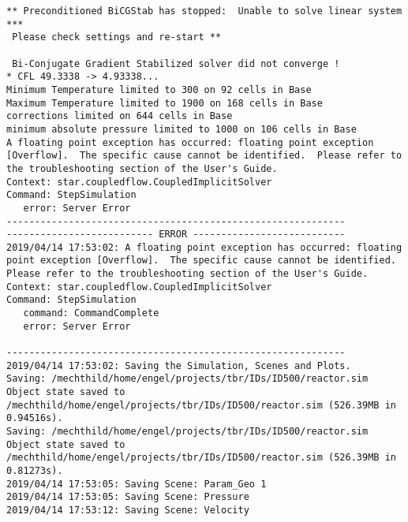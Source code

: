 \documentclass{article}
\begin{document}
{\begin{verbatim}
** Preconditioned BiCGStab has stopped:  Unable to solve linear system *** 
 Please check settings and re-start ** 

 Bi-Conjugate Gradient Stabilized solver did not converge !
* CFL 49.3338 -> 4.93338...
Minimum Temperature limited to 300 on 92 cells in Base
Maximum Temperature limited to 1900 on 168 cells in Base
corrections limited on 644 cells in Base
minimum absolute pressure limited to 1000 on 106 cells in Base
A floating point exception has occurred: floating point exception [Overflow].  The specific cause cannot be identified.  Please refer to the troubleshooting section of the User's Guide.
Context: star.coupledflow.CoupledImplicitSolver
Command: StepSimulation
   error: Server Error
------------------------------------------------------------
-------------------------- ERROR ---------------------------
2019/04/14 17:53:02: A floating point exception has occurred: floating point exception [Overflow].  The specific cause cannot be identified.  Please refer to the troubleshooting section of the User's Guide.
Context: star.coupledflow.CoupledImplicitSolver
Command: StepSimulation
   command: CommandComplete
   error: Server Error

------------------------------------------------------------
2019/04/14 17:53:02: Saving the Simulation, Scenes and Plots.
Saving: /mechthild/home/engel/projects/tbr/IDs/ID500/reactor.sim
Object state saved to /mechthild/home/engel/projects/tbr/IDs/ID500/reactor.sim (526.39MB in 0.94516s).
Saving: /mechthild/home/engel/projects/tbr/IDs/ID500/reactor.sim
Object state saved to /mechthild/home/engel/projects/tbr/IDs/ID500/reactor.sim (526.39MB in 0.81273s).
2019/04/14 17:53:05: Saving Scene: Param_Geo 1
2019/04/14 17:53:05: Saving Scene: Pressure
2019/04/14 17:53:12: Saving Scene: Velocity
\end{verbatim}
}
\clearpage
\end{document}
